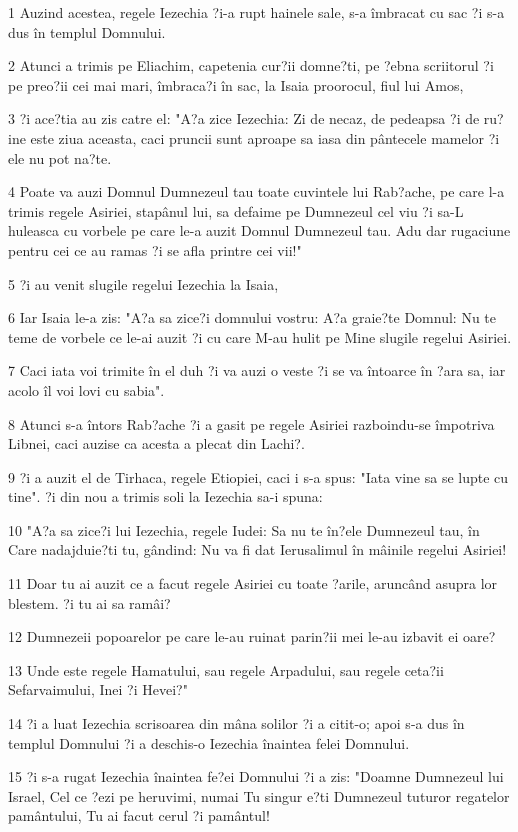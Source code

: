 \par 1 Auzind acestea, regele Iezechia ?i-a rupt hainele sale, s-a îmbracat cu sac ?i s-a dus în templul Domnului.
\par 2 Atunci a trimis pe Eliachim, capetenia cur?ii domne?ti, pe ?ebna scriitorul ?i pe preo?ii cei mai mari, îmbraca?i în sac, la Isaia proorocul, fiul lui Amos,
\par 3 ?i ace?tia au zis catre el: "A?a zice Iezechia: Zi de necaz, de pedeapsa ?i de ru?ine este ziua aceasta, caci pruncii sunt aproape sa iasa din pântecele mamelor ?i ele nu pot na?te.
\par 4 Poate va auzi Domnul Dumnezeul tau toate cuvintele lui Rab?ache, pe care l-a trimis regele Asiriei, stapânul lui, sa defaime pe Dumnezeul cel viu ?i sa-L huleasca cu vorbele pe care le-a auzit Domnul Dumnezeul tau. Adu dar rugaciune pentru cei ce au ramas ?i se afla printre cei vii!"
\par 5 ?i au venit slugile regelui Iezechia la Isaia,
\par 6 Iar Isaia le-a zis: "A?a sa zice?i domnului vostru: A?a graie?te Domnul: Nu te teme de vorbele ce le-ai auzit ?i cu care M-au hulit pe Mine slugile regelui Asiriei.
\par 7 Caci iata voi trimite în el duh ?i va auzi o veste ?i se va întoarce în ?ara sa, iar acolo îl voi lovi cu sabia".
\par 8 Atunci s-a întors Rab?ache ?i a gasit pe regele Asiriei razboindu-se împotriva Libnei, caci auzise ca acesta a plecat din Lachi?.
\par 9 ?i a auzit el de Tirhaca, regele Etiopiei, caci i s-a spus: "Iata vine sa se lupte cu tine". ?i din nou a trimis soli la Iezechia sa-i spuna:
\par 10 "A?a sa zice?i lui Iezechia, regele Iudei: Sa nu te în?ele Dumnezeul tau, în Care nadajduie?ti tu, gândind: Nu va fi dat Ierusalimul în mâinile regelui Asiriei!
\par 11 Doar tu ai auzit ce a facut regele Asiriei cu toate ?arile, aruncând asupra lor blestem. ?i tu ai sa ramâi?
\par 12 Dumnezeii popoarelor pe care le-au ruinat parin?ii mei le-au izbavit ei oare?
\par 13 Unde este regele Hamatului, sau regele Arpadului, sau regele ceta?ii Sefarvaimului, Inei ?i Hevei?"
\par 14 ?i a luat Iezechia scrisoarea din mâna solilor ?i a citit-o; apoi s-a dus în templul Domnului ?i a deschis-o Iezechia înaintea felei Domnului.
\par 15 ?i s-a rugat Iezechia înaintea fe?ei Domnului ?i a zis: "Doamne Dumnezeul lui Israel, Cel ce ?ezi pe heruvimi, numai Tu singur e?ti Dumnezeul tuturor regatelor pamântului, Tu ai facut cerul ?i pamântul!
